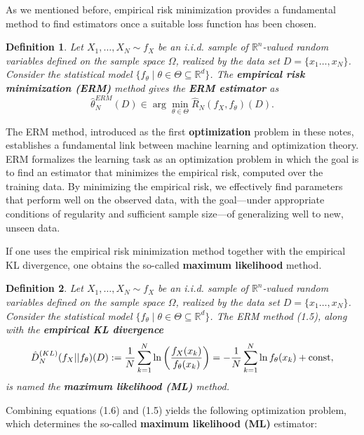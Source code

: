 \documentclass{report}
\newtheorem{definition}{Definition}[chapter]
\begin{document}
As we mentioned before, empirical risk minimization provides a fundamental method to find estimators once a suitable loss function has been chosen.
\begin{definition}
Let $X_1,\dots,X_N \sim f_X$ be an i.i.d. sample of $\mathbb{R}^n$-valued random variables defined on the sample space $\Omega$, realized by the data set $D = \{x_1\dots,x_N\}$. Consider the statistical model $\{f_\theta \mid \theta \in \Theta \subseteq \mathbb{R}^d\}$. The \textbf{empirical risk minimization (ERM)} method gives the \textbf{ERM estimator} as
\begin{equation}
\hat{\theta}^{ERM}_N(D) \in \arg\min_{\theta \in \Theta}\hat{R}_N(f_X,f_\theta)(D).
\end{equation}
\end{definition}

The ERM method, introduced as the first \textbf{optimization} problem in these notes, establishes a fundamental link between machine learning and optimization theory. ERM formalizes the learning task as an optimization problem in which the goal is to find an estimator that minimizes the empirical risk, computed over the training data. By minimizing the empirical risk, we effectively find parameters that perform well on the observed data, with the goal—under appropriate conditions of regularity and sufficient sample size—of generalizing well to new, unseen data.

If one uses the empirical risk minimization method together with the empirical KL divergence, one obtains the so-called \textbf{maximum likelihood} method.

\begin{definition}
Let $X_1,\dots,X_N \sim f_X$ be an i.i.d. sample of $\mathbb{R}^n$-valued random variables defined on the sample space $\Omega$, realized by the data set $D=\{x_1\dots,x_N\}$. Consider the statistical model $\{f_\theta \mid \theta \in \Theta \subseteq \mathbb{R}^d\}$. The ERM method (1.5), along with the \textbf{empirical KL divergence}
\begin{equation}
\hat{D}^{(KL)}_N(f_X||f_\theta)(D) := \frac{1}{N} \sum_{k=1}^{N} \ln \left(\frac{f_X(x_k)}{f_\theta(x_k)}\right) = -\frac{1}{N} \sum_{k=1}^{N} \ln  f_\theta(x_k) + \textup{const},
\end{equation}
is named the \textbf{maximum likelihood (ML)} method.
\end{definition}

Combining equations (1.6) and (1.5) yields the following optimization problem, which determines the so-called \textbf{maximum likelihood (ML)} estimator:
\end{document}
